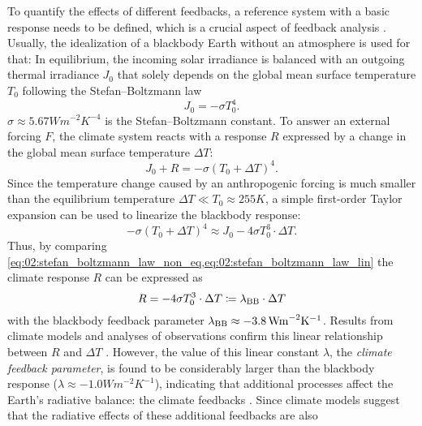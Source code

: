To quantify the effects of different feedbacks, a reference system with a basic
response needs to be defined, which is a crucial aspect of feedback analysis
\autocite{Roe2009}. Usually, the idealization of a blackbody Earth without an
atmosphere is used for that: In equilibrium, the incoming solar irradiance is
balanced with an outgoing thermal irradiance $J_0$ that solely depends on the
global mean surface temperature $T_0$ following the Stefan–Boltzmann law
\begin{equation}
  J_0 = -\sigma T_0^4.
  \label{eq:02:stefan_boltzmann_law_eq}
\end{equation}
$\sigma \approx 5.67 \unit{W m^{-2} K^{-4}}$ is the Stefan–Boltzmann constant.
To answer an external forcing $F$, the climate system reacts with a response
$R$ expressed by a change in the global mean surface temperature $\Delta T$:
\begin{equation}
  J_0 + R = -\sigma \left( T_0 + \Delta T \right)^4.
  \label{eq:02:stefan_boltzmann_law_non_eq}
\end{equation}
Since the temperature change caused by an anthropogenic forcing is much smaller
than the equilibrium temperature $\Delta T \ll T_0 \approx 255 \unit{K}$, a
simple first-order Taylor expansion can be used to linearize the blackbody
response:
\begin{equation}
  -\sigma \left( T_0 + \Delta T \right)^4 \approx J_0 - 4 \sigma T_0^3 \cdot
  \Delta T.
  \label{eq:02:stefan_boltzmann_law_lin}
\end{equation}
Thus, by comparing
\cref{eq:02:stefan_boltzmann_law_non_eq,eq:02:stefan_boltzmann_law_lin} the
climate response $R$ can be expressed as
\begin{equation}
  R = -4 \sigma T_0^3 \cdot \Delta T \coloneq \lambda_\mathtxt{BB} \cdot
  \Delta T
  \label{eq:02:linear_blackbody_response}
\end{equation}
with the blackbody feedback parameter $\lambda_\mathtxt{BB} \approx -3.8
\unit{W m^{-2} K^{-1}}$. Results from climate models and analyses of
observations confirm this linear relationship between $R$ and $\Delta T$
\autocite{Gregory2004}. However, the value of this linear constant $\lambda$,
the \emph{climate feedback parameter}, is found to be considerably larger than
the blackbody response ($\lambda \approx -1.0 \unit{W m^{-2} K^{-1}}$),
indicating that additional processes affect the Earth's radiative balance: the
climate feedbacks \autocite{Flato2013, Gregory2009}. Since climate models
suggest that the radiative effects of these additional feedbacks are also

